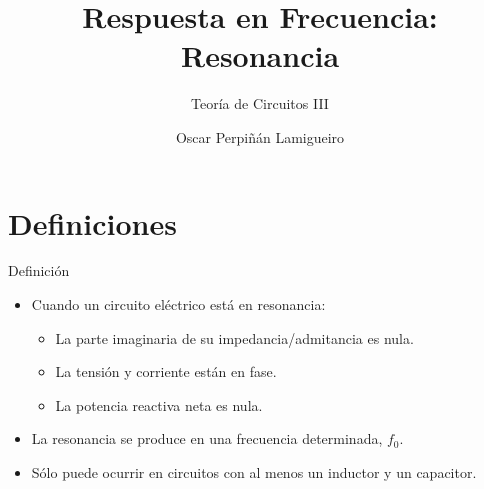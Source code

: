 \documentclass[aspectratio=169, usenames,svgnames,dvipsnames]{beamer}
\author{Oscar Perpiñán Lamigueiro}
\date{}
\title{Respuesta en Frecuencia: Resonancia}
\subtitle{Teoría de Circuitos III}
\begin{document}
\maketitle

\section{Definiciones}
\label{sec:org2333f3c}
\begin{frame}[label={sec:orged7f565}]{Definición}
\begin{itemize}
\item Cuando un circuito eléctrico está en resonancia:
\begin{itemize}
\item La \alert{parte imaginaria} de su impedancia/admitancia es \alert{nula}.
\item La \alert{tensión y corriente} están en \alert{fase}.
\item La \alert{potencia reactiva} neta es \alert{nula}.
\end{itemize}
\item La resonancia se produce en una \alert{frecuencia determinada}, \(f_0\).
\item Sólo puede ocurrir en circuitos con \alert{al menos un inductor y un capacitor}.
\end{itemize}
\end{frame}
\end{document}
